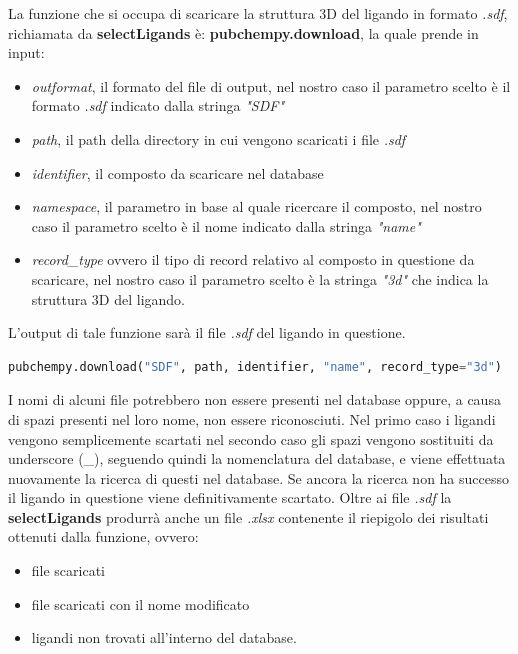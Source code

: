 La funzione che si occupa di scaricare la struttura 3D del ligando in formato \textit{.sdf}, richiamata da \textbf{selectLigands} è: \textbf{pubchempy.download}, la quale prende in input:

\begin{itemize}
    \item \textit{outformat}, il formato del file di output, nel nostro caso il parametro scelto è il formato \textit{.sdf} indicato dalla stringa \textit{"SDF"}
    \item \textit{path}, il path della directory in cui vengono scaricati i file \textit{.sdf}
    \item \textit{identifier}, il composto da scaricare nel database
    \item \textit{namespace}, il parametro in base al quale ricercare il composto, nel nostro caso il parametro scelto è il nome indicato dalla stringa \textit{"name"}
    \item \textit{record\_type} ovvero il tipo di record relativo al composto in questione da scaricare, 
    nel nostro caso il parametro scelto è la stringa \textit{"3d"} che indica la struttura 3D del ligando.
\end{itemize}

L'output di tale funzione sarà il file \textit{.sdf} del ligando in questione.

\begin{lstlisting}[language=Python,  label=lst:code6, caption={pubchempy.download}]
pubchempy.download("SDF", path, identifier, "name", record_type="3d")
\end{lstlisting}

I nomi di alcuni file potrebbero non essere presenti nel database oppure, a causa di spazi presenti nel loro nome, non essere riconosciuti. Nel primo caso i ligandi vengono semplicemente scartati nel secondo caso gli spazi vengono sostituiti da underscore (\_), seguendo quindi la nomenclatura del database, e viene effettuata nuovamente la ricerca di questi nel database. Se ancora la ricerca non ha successo il ligando in questione viene definitivamente scartato.\newline
Oltre ai file \textit{.sdf} la \textbf{selectLigands} produrrà anche un file \textit{.xlsx} contenente il riepigolo dei risultati ottenuti dalla funzione, ovvero:

\begin{itemize}
    \item file scaricati
    \item file scaricati con il nome modificato 
    \item ligandi non trovati all'interno del database.
\end{itemize}

